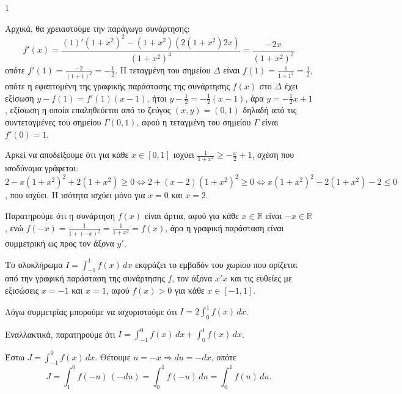 \begin{ylh}{1}
    \item [Διαφορικός Λογισμός, Ολοκληρωτικός Λογισμός, Γραφική Παράσταση Συνάρτησης, Εμβαδόν]
\end{ylh}
\begin{alist}
    \item [Α] Αρχικά, θα χρειαστούμε την παράγωγο συνάρτησης:
    \[ f'(x) = \frac{(1)'(1+x^2)^2 - (1+x^2)(2(1+x^2)2x)}{(1+x^2)^4} = \frac{-2x}{(1+x^2)^2} \]
    οπότε $f'(1) = \frac{-2}{(1+1)^2} = -\frac{1}{2}$. Η τεταγμένη του σημείου $\Delta$ είναι $f(1) = \frac{1}{1+1^2} = \frac{1}{2}$, οπότε η εφαπτομένη της γραφικής παράστασης της συνάρτησης $f(x)$ στο $\Delta$ έχει εξίσωση $y - f(1) = f'(1)(x - 1)$, ήτοι $y - \frac{1}{2} = -\frac{1}{2}(x - 1)$, άρα $y = -\frac{1}{2}x + 1$, εξίσωση η οποία επαληθεύεται από το ζεύγος $(x, y) = (0,1)$ δηλαδή από τις συντεταγμένες του σημείου $\Gamma(0,1)$, αφού η τεταγμένη του σημείου $\Gamma$ είναι $f'(0) = 1$. 
    \item [Β] Αρκεί να αποδείξουμε ότι για κάθε $x \in [0,1]$ ισχύει $\frac{1}{1+x^2} \ge -\frac{x}{2} + 1$, σχέση που ισοδύναμα γράφεται:
    $2 - x(1+x^2)^2 + 2(1+x^2) \ge 0 \Leftrightarrow 2 + (x-2)(1+x^2)^2 \ge 0 \Leftrightarrow x(1+x^2)^2 - 2(1+x^2) - 2 \le 0$,
    που ισχύει. Η ισότητα ισχύει μόνο για $x=0$ και $x=2$. 
    \item [Γ] Παρατηρούμε ότι η συνάρτηση $f(x)$ είναι άρτια, αφού για κάθε $x \in \mathbb{R}$ είναι
    $ -x \in \mathbb{R}$, ενώ $f(-x) = \frac{1}{1+(-x)^2} = \frac{1}{1+x^2} = f(x)$, άρα η γραφική παράσταση είναι συμμετρική ως προς τον άξονα $y'$.
    \vspace{0.5\baselineskip}

    Το ολοκλήρωμα $I = \int_{-1}^{1} f(x) \,dx$ εκφράζει το εμβαδόν του χωρίου που ορίζεται από την γραφική παράσταση της συνάρτησης $f$, τον άξονα $x'x$ και τις ευθείες με εξισώσεις $x = -1$ και $x = 1$, αφού $f(x) > 0$ για κάθε $x \in [-1,1]$.
    \vspace{0.5\baselineskip}

    Λόγω συμμετρίας μπορούμε να ισχυριστούμε ότι $I = 2 \int_{0}^{1} f(x) \,dx$.
    \vspace{0.5\baselineskip}

    Εναλλακτικά, παρατηρούμε ότι $I = \int_{-1}^{0} f(x) \,dx + \int_{0}^{1} f(x) \,dx$.
    \vspace{0.5\baselineskip}

    Έστω $J = \int_{-1}^{0} f(x) \,dx$. Θέτουμε $u = -x \Rightarrow du = -dx$, οπότε
    \[ J = \int_{1}^{0} f(-u) \,(-du) = \int_{0}^{1} f(-u) \,du = \int_{0}^{1} f(u) \,du. \]
    \vspace{0.5\baselineskip}


\end{alist}
